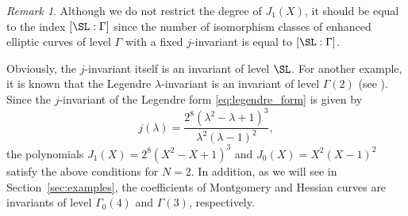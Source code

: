 \documentclass{amsart}
\theoremstyle{definition}
\theoremstyle{remark}
\newtheorem{remark}[theorem]{Remark}
\numberwithin{equation}{section}
\begin{document}
\begin{remark}\label{rem:degree_J1}
    Although we do not restrict the degree of $J_1(X)$,
    it should be equal to the index $[\SL : \Gamma]$
    since the number of isomorphism classes of enhanced elliptic curves of level $\Gamma$
    with a fixed $j$-invariant is equal to $[\SL : \Gamma]$.
\end{remark}

Obviously, the $j$-invariant itself is an invariant of level $\SL$.
For another example,
it is known that the Legendre $\lambda$-invariant
is an invariant of level $\Gamma(2)$ (see \cite[Chapter 18, \S 6]{lang1987elliptic}).
Since the $j$-invariant of the Legendre form \eqref{eq:legendre_form} is given by
\begin{equation*}
    j(\lambda) = \frac{2^8(\lambda^2 - \lambda + 1)^3}{\lambda^2 (\lambda - 1)^2}, 
\end{equation*}
the polynomials $J_1(X) = 2^8 (X^2 - X + 1)^3$ and $J_0(X) = X^2 (X - 1)^2$
satisfy the above conditions for $N = 2$.
In addition,
as we will see in Section~\ref{sec:examples},
the coefficients of Montgomery and Hessian curves are invariants of level $\Gamma_0(4)$ and $\Gamma(3)$, respectively.
\end{document}
